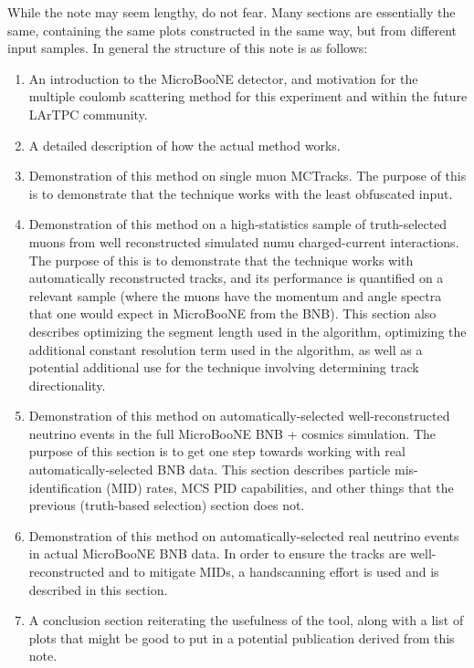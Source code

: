 \documentclass{article}
\begin{document}
While the note may seem lengthy, do not fear. Many sections are essentially the same, containing the same plots constructed in the same way, but from different input samples. In general the structure of this note is as follows:
\begin{enumerate}
\item An introduction to the MicroBooNE detector, and motivation for the multiple coulomb scattering method for this experiment and within the future LArTPC community.
\item A detailed description of how the actual method works.
\item Demonstration of this method on single muon {\sc MCTracks}. The purpose of this is to demonstrate that the technique works with the least obfuscated input.
\item Demonstration of this method on a high-statistics sample of truth-selected muons from well reconstructed simulated numu charged-current interactions. The purpose of this is to demonstrate that the technique works with automatically reconstructed tracks, and its performance is quantified on a relevant sample (where the muons have the momentum and angle spectra that one would expect in MicroBooNE from the BNB). This section also describes optimizing the segment length used in the algorithm, optimizing the additional constant resolution term used in the algorithm, as well as a potential additional use for the technique involving determining track directionality.
\item Demonstration of this method on automatically-selected well-reconstructed neutrino events in the full MicroBooNE BNB + cosmics simulation. The purpose of this section is to get one step towards working with real automatically-selected BNB data. This section describes particle mis-identification (MID) rates, MCS PID capabilities, and other things that the previous (truth-based selection) section does not.
\item Demonstration of this method on automatically-selected real neutrino events in actual MicroBooNE BNB data. In order to ensure the tracks are well-reconstructed and to mitigate MIDs, a handscanning effort is used and is described in this section.
\item A conclusion section reiterating the usefulness of the tool, along with a list of plots that might be good to put in a potential publication derived from this note.
\end{enumerate}











\clearpage

\end{document}
